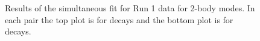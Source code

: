 \begin{figure}
\hfill
{}
\hfill
{}
\hfill
{}
\caption{Results of the simultaneous fit for Run 1 data for 2-body modes. In each pair the top plot is for \Bp decays and the bottom plot is for \Bm decays.}
\label{datafit2bodyRun2}
\end{figure}

